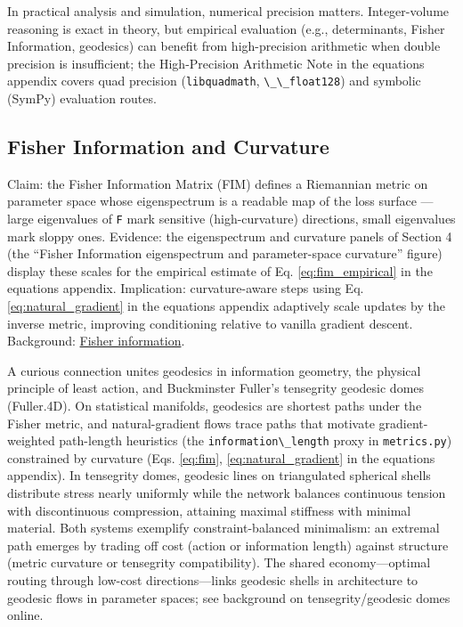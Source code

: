 \documentclass[
  10pt,
]{article}
\newcommand{\passthrough}[1]{#1}
\begin{document}
In practical analysis and simulation, numerical precision matters.
Integer-volume reasoning is exact in theory, but empirical evaluation
(e.g., determinants, Fisher Information, geodesics) can benefit from
high-precision arithmetic when double precision is insufficient; the
High-Precision Arithmetic Note in the equations appendix covers quad
precision (\passthrough{\lstinline!libquadmath!},
\passthrough{\lstinline!\_\_float128!}) and symbolic (SymPy) evaluation
routes.

\subsection{Fisher Information and
Curvature}\label{fisher-information-and-curvature}

Claim: the Fisher Information Matrix (FIM) defines a Riemannian metric
on parameter space whose eigenspectrum is a readable map of the loss
surface --- large eigenvalues of \passthrough{\lstinline!F!} mark
sensitive (high-curvature) directions, small eigenvalues mark sloppy
ones. Evidence: the eigenspectrum and curvature panels of Section 4 (the
``Fisher Information eigenspectrum and parameter-space curvature''
figure) display these scales for the empirical estimate of Eq.
\eqref{eq:fim_empirical} in the equations appendix. Implication:
curvature-aware steps using Eq. \eqref{eq:natural_gradient} in the
equations appendix adaptively scale updates by the inverse metric,
improving conditioning relative to vanilla gradient descent. Background:
\href{https://en.wikipedia.org/wiki/Fisher_information}{Fisher
information}.

A curious connection unites geodesics in information geometry, the
physical principle of least action, and Buckminster Fuller's tensegrity
geodesic domes (Fuller.4D). On statistical manifolds, geodesics are
shortest paths under the Fisher metric, and natural-gradient flows trace
paths that motivate gradient-weighted path-length heuristics (the
\passthrough{\lstinline!information\_length!} proxy in
\passthrough{\lstinline!metrics.py!}) constrained by curvature (Eqs.
\eqref{eq:fim}, \eqref{eq:natural_gradient} in the equations appendix).
In tensegrity domes, geodesic lines on triangulated spherical shells
distribute stress nearly uniformly while the network balances continuous
tension with discontinuous compression, attaining maximal stiffness with
minimal material. Both systems exemplify constraint-balanced minimalism:
an extremal path emerges by trading off cost (action or information
length) against structure (metric curvature or tensegrity
compatibility). The shared economy---optimal routing through low-cost
directions---links geodesic shells in architecture to geodesic flows in
parameter spaces; see background on tensegrity/geodesic domes online.
\end{document}
